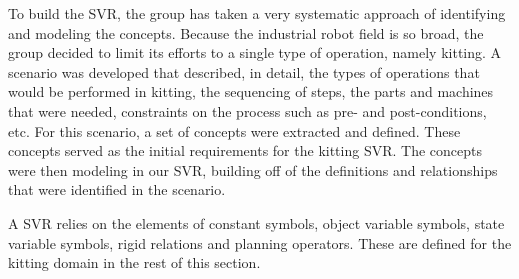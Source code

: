 To build the SVR, the group has taken a very systematic approach of identifying and modeling the concepts. Because the industrial robot field is so broad, the group decided to limit its efforts to a single type of operation, namely kitting. A scenario was developed that described, in detail, the types of operations that would be performed in kitting, the sequencing of steps, the parts and machines that were needed, constraints on the process such as pre- and post-conditions, etc. For this scenario, a set of concepts were extracted and defined. These concepts served as the initial requirements for the kitting SVR. The concepts were then modeling in our SVR, building off of the definitions and relationships that were identified in the scenario.

A SVR relies on the elements of constant symbols, object variable symbols, state variable symbols, rigid relations and planning operators. These are defined for the kitting domain in the rest of this section.


